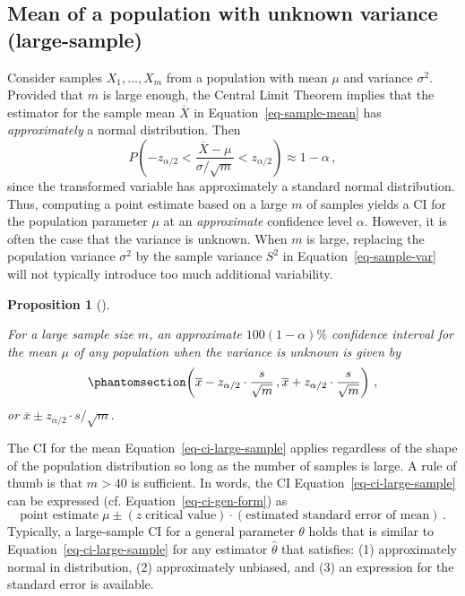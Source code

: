 \documentclass[
  a4paper,
  DIV=11,
  numbers=noendperiod,
  oneside]{scrreprt}
\theoremstyle{plain}
\theoremstyle{definition}
\theoremstyle{definition}
\theoremstyle{definition}
\theoremstyle{plain}
\newtheorem{proposition}{Proposition}[chapter]
\theoremstyle{remark}
\begin{document}
\subsection{Mean of a population with unknown variance
(large-sample)}\label{sec-mean-large-sample}

Consider samples \(X_1, \dots, X_m\) from a population with mean \(\mu\)
and variance \(\sigma^2.\) Provided that \(m\) is large enough, the
Central Limit Theorem implies that the estimator for the sample mean
\(\overline{X}\) in Equation~\ref{eq-sample-mean} has
\emph{approximately} a normal distribution. Then \[
P \left( - z_{\alpha/2} < \frac{\overline{X} - \mu}{\sigma/\sqrt{m}} < z_{\alpha/2} \right) \approx 1 - \alpha\,,
\] since the transformed variable has approximately a standard normal
distribution. Thus, computing a point estimate based on a large \(m\) of
samples yields a CI for the population parameter \(\mu\) at an
\emph{approximate} confidence level \(\alpha.\) However, it is often the
case that the variance is unknown. When \(m\) is large, replacing the
population variance \(\sigma^2\) by the sample variance \(S^2\) in
Equation~\ref{eq-sample-var} will not typically introduce too much
additional variability.

\begin{proposition}[]\protect\hypertarget{prp-ci-large-sample}{}\label{prp-ci-large-sample}

For a large sample size \(m\), an approximate \(100(1-\alpha)\%\)
confidence interval for the mean \(\mu\) of any population when the
variance is unknown is given by
\begin{equation}\phantomsection\label{eq-ci-large-sample}{
 \left(\overline{x} - z_{\alpha/2} \cdot \frac{s}{\sqrt{m}} \,, 
        \overline{x} + z_{\alpha/2} \cdot \frac{s}{\sqrt{m}} \right)\,,  
}\end{equation} or \(\overline{x} \pm z_{\alpha/2} \cdot s / \sqrt{m}.\)

\end{proposition}

The CI for the mean Equation~\ref{eq-ci-large-sample} applies regardless
of the shape of the population distribution so long as the number of
samples is large. A rule of thumb is that \(m > 40\) is sufficient. In
words, the CI Equation~\ref{eq-ci-large-sample} can be expressed (cf.
Equation~\ref{eq-ci-gen-form}) as \[
 \text{point estimate}\; \mu \pm 
 (z \;\text{critical value}) \cdot (\text{estimated standard error of mean})\,.
\] Typically, a large-sample CI for a general parameter \(\theta\) holds
that is similar to Equation~\ref{eq-ci-large-sample} for any estimator
\(\widehat{\theta}\) that satisfies: (1) approximately normal in
distribution, (2) approximately unbiased, and (3) an expression for the
standard error is available.
\end{document}
